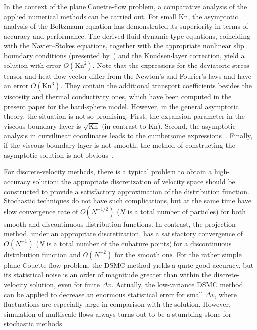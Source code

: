 \documentclass[review]{elsarticle}
\newcommand{\Kn}{\mathrm{Kn}}
\newcommand{\OO}[1]{O(#1)}
\begin{document}
In the context of the plane Couette-flow problem,
a comparative analysis of the applied numerical methods can be carried out.
For small \(\Kn\), the asymptotic analysis of the Boltzmann equation has demonstrated
its superiority in terms of accuracy and performance.
The derived fluid-dynamic-type equations, coinciding with the Navier--Stokes equations,
together with the appropriate nonlinear slip boundary conditions (presented by~\citet{Sone2000})
and the Knudsen-layer correction, yield a solution with error \(\OO{\Kn^2}\).
Note that the expressions for the deviatoric stress tensor and heat-flow vector
differ from the Newton's and Fourier's laws and have an error \(\OO{\Kn^3}\).
They contain the additional transport coefficients besides the viscosity and thermal conductivity ones,
which have been computed in the present paper for the hard-sphere model.
However, in the general asymptotic theory, the situation is not so promising.
First, the expansion parameter in the viscous boundary layer is \(\sqrt{\Kn}\) (in contrast to \(\Kn\)).
Second, the asymptotic analysis in curvilinear coordinates leads to the cumbersome expressions~\citep{Sone2002}.
Finally, if the viscous boundary layer is not smooth,
the method of constructing the asymptotic solution is not obvious~\citep{Aoki2014}.

For discrete-velocity methods, there is a typical problem to obtain a high-accuracy solution:
the appropriate discretization of velocity space should be constructed
to provide a satisfactory approximation of the distribution function.
Stochastic techniques do not have such complications,
but at the same time have slow convergence rate of \(\OO{N^{-1/2}}\)
(\(N\) is a total number of particles)
for both smooth and discontinuous distribution functions.
In contrast, the projection method, under an appropriate discretization,
has a satisfactory convergence of \(\OO{N^{-1}}\)
(\(N\) is a total number of the cubature points)
for a discontinuous distribution function and \(\OO{N^{-2}}\) for the smooth one.
For the rather simple plane Couette-flow problem,
the DSMC method yields a quite good accuracy, but its statistical noise
is an order of magnitude greater than within the discrete-velocity solution, even for finite \(\Delta{v}\).
Actually, the low-variance DSMC method~\citep{Hadji2011}
can be applied to decrease an enormous statistical error for small \(\Delta{v}\),
where fluctuations are especially large in comparison with the solution.
However, simulation of multiscale flows always turns out to be a stumbling stone for stochastic methods.
\end{document}
